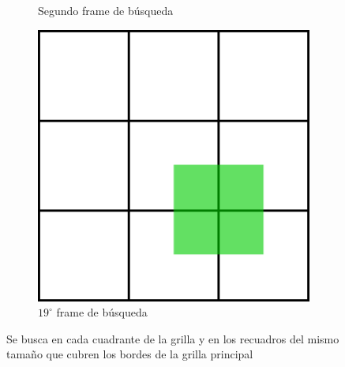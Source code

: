 \begin{figure}
\begin{subfigure}[b]{0.25\textwidth}
		\caption{Segundo frame de búsqueda}
		\label{frames_solapados_2}
	\end{subfigure}	
	\quad
	\begin{subfigure}[b]{0.25\textwidth}
		\includegraphics[width=\textwidth]{img/decimonovenocuadrante.png}
		\caption{$19^{\circ}$ frame de búsqueda}
		\label{frames_solapados_3}
	\end{subfigure}
	\caption{Se busca en cada cuadrante de la grilla y en los recuadros del mismo tamaño que cubren los bordes de la grilla principal}
	\label{frames_solapados}
\end{figure}


